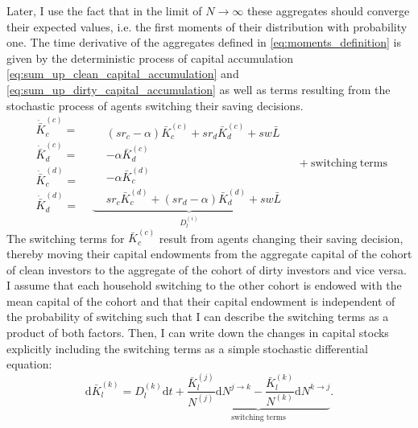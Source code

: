 Later, I use the fact that in the limit of $N \rightarrow \infty$ these aggregates should converge their expected values, i.e. the first moments of their distribution with probability one.
The time derivative of the aggregates defined in \eqref{eq:moments_definition} is given by the deterministic process of capital accumulation \eqref{eq:sum_up_clean_capital_accumulation} and \eqref{eq:sum_up_dirty_capital_accumulation} as well as terms resulting from the stochastic process of agents switching their saving decisions. 
\begin{equation}
      \begin{aligned}
          \dot{\bar{K}}_c^{(c)} =&  \\
          \dot{\bar{K}}_d^{(c)} =&  \\
          \dot{\bar{K}}_c^{(d)} =&  \\
          \dot{\bar{K}}_d^{(d)} =& 
      \end{aligned}
  \underbrace{ 
      \begin{aligned}
      &(sr_c - \alpha)\bar{K}_c^{(c)} + s r_d \bar{K}_d^{(c)} + s w \bar{L} \\
      &- \alpha\bar{K}_d^{(c)} \\
      &- \alpha\bar{K}_c^{(d)} \\
      &sr_c \bar{K}_c^{(d)} + (s r_d - \alpha)\bar{K}_d^{(d)} + s w \bar{L}
      \end{aligned}
  }_{\textstyle D^{(i)}_{l} } \quad + \mathrm{switching\ terms} \label{eq:sterm0}
\end{equation}
The switching terms for $\bar{K}_c^{(c)}$ result from agents changing their saving decision, thereby moving their capital endowments from the aggregate capital of the cohort of clean investors to the aggregate of the cohort of dirty investors and vice versa. I assume that each household switching to the other cohort is endowed with the mean capital of the cohort and that their capital endowment is independent of the probability of switching such that I can describe the switching terms as a product of both factors. Then, I can write down the changes in capital stocks explicitly including the switching terms as a simple stochastic differential equation:
\begin{equation}
	\mathrm{ d}\bar{K}_{l}^{(k)} = D^{(k)}_{l} \mathrm{ d}t + \underbrace{\frac{\bar{K}_l^{(j)}}{N^{(j)}} \mathrm{ d} N^{j \rightarrow k} -  \frac{\bar{K}_l^{(k)}}{N^{(k)}} \mathrm{ d} N^{k \rightarrow j} }_{\text{switching terms}}.
	\label{eq:aggregated_capital_time_derivative}
\end{equation}
